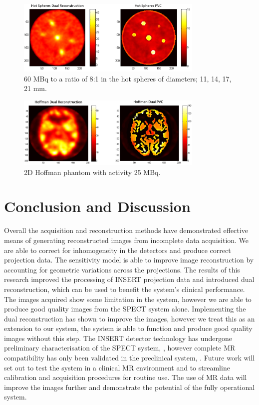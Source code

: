 \begin{figure}[!t]
\centering
\includegraphics[width=3.5in]{figures/HotSpheres.png}

\caption{60 MBq to a ratio of 8:1 in the hot spheres of diameters; 11, 14, 17, 21 mm.}
\label{fig_Hot}
\end{figure}

\begin{figure}[!t]
\centering
\includegraphics[width=3.5in]{figures/Hoffman.png}

\caption{2D Hoffman phantom with activity 25 MBq.}
\label{fig_Hoffman}
\end{figure}


\section{Conclusion and Discussion}
Overall the acquisition and reconstruction methods have demonstrated effective means of generating reconstructed images from incomplete data acquisition. We are able to correct for inhomogeneity in the detectors and produce correct projection data. The sensitivity model is able to improve image reconstruction by accounting for geometric variations across the projections. The results of this research improved the processing of INSERT projection data and introduced dual reconstruction, which can be used to benefit the system's clinical performance.
The images acquired show some limitation in the system, however we are able to produce good quality images from the SPECT system alone. Implementing the dual reconstruction has shown to improve the images, however we treat this as an extension to our system, the system is able to function and produce good quality images without this step. The INSERT detector technology has undergone preliminary characterisation of the SPECT system, \cite{8891783}, however complete MR compatibility has only been validated in the preclinical system, \cite{8612977}. Future work will set out to test the system in a clinical MR environment and to streamline calibration and acquisition procedures for routine use. The use of MR data will improve the images further and demonstrate the potential of the fully operational system.   

